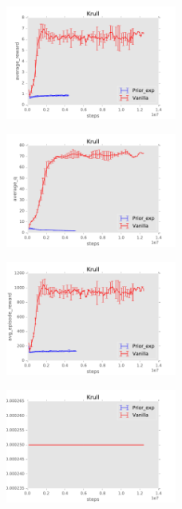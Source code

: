\documentclass{sig-alternate}
\begin{document}
\begin{figure}
    \centering
    \includegraphics[width=0.5\textwidth]{../results/Krull/Comparisons/Prior_exp/Prior_exp-baseline-average_reward.pdf}
\end{figure}

\begin{figure}
    \centering
    \includegraphics[width=0.5\textwidth]{../results/Krull/Comparisons/Prior_exp/Prior_exp-baseline-average_q.pdf}
\end{figure}

\begin{figure}
    \centering
    \includegraphics[width=0.5\textwidth]{../results/Krull/Comparisons/Prior_exp/Prior_exp-baseline-avg_episode_reward.pdf}
\end{figure}

\begin{figure}
    \centering
    \includegraphics[width=0.5\textwidth]{../results/Krull/Comparisons/Prior_exp/Prior_exp-baseline-learning_rate.pdf}
\end{figure}
\end{document}
